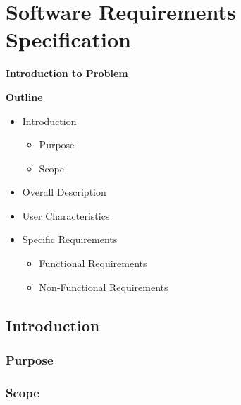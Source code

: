 \section{Software Requirements Specification}

\vspace{20mm}

\Huge{\textbf{Introduction to Problem}}

\vspace{20mm}


\begin{abstract}
    \blindtext[2]
\end{abstract}

\vspace{20mm}

\large{\textbf{Outline}}

\begin{center}
    \begin{itemize}
        \item Introduction
              \begin{itemize}
                  \item Purpose
                  \item Scope
              \end{itemize}
        \item Overall Description
        \item User Characteristics
        \item Specific Requirements
              \begin{itemize}
                  \item Functional Requirements
                  \item Non-Functional Requirements
              \end{itemize}
    \end{itemize}
\end{center}
\pagebreak


\subsection{Introduction}
\blindtext[2]
\subsubsection{Purpose}
\blindtext[1]
\subsubsection{Scope}
\blindtext[1]


